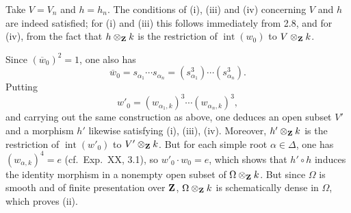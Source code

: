 Take $V=V_n$ and $h=h_n$. The conditions of (i), (iii) and (iv) concerning $V$ and $h$ are indeed satisfied; for (i) and (iii) this follows immediately from 2.8, and for (iv), from the fact that $h\otimes_{\mathbf{Z}} k$ is the restriction of $\operatorname{int}(w_0)$ to $V\otimes_{\mathbf{Z}} k$.

Since $(\overline w_0)^2=1$, one also has
\[
\overline w_0=s_{\alpha_1}\cdots s_{\alpha_n}=(s_{\alpha_1}^3)\cdots(s_{\alpha_n}^3).
\]
Putting
\[
w'_0=(w_{\alpha_1,k})^3\cdots(w_{\alpha_n,k})^3,
\]
and carrying out the same construction as above, one deduces an open subset $V'$ and a morphism $h'$ likewise satisfying (i), (iii), (iv). Moreover, $h'\otimes_{\mathbf{Z}} k$ is the restriction of $\operatorname{int}(w'_0)$ to $V'\otimes_{\mathbf{Z}} k$. But for each simple root $\alpha\in\Delta$, one has $(w_{\alpha,k})^4=e$ (cf.~Exp.~XX, 3.1), so $w'_0\cdot w_0=e$, which shows that $h'\circ h$ induces the identity morphism in a nonempty open subset of $\Omega\otimes_{\mathbf{Z}} k$. But since $\Omega$ is smooth and of finite presentation over $\mathbf{Z}$, $\Omega\otimes_{\mathbf{Z}} k$ is schematically dense in $\Omega$, which proves (ii).

